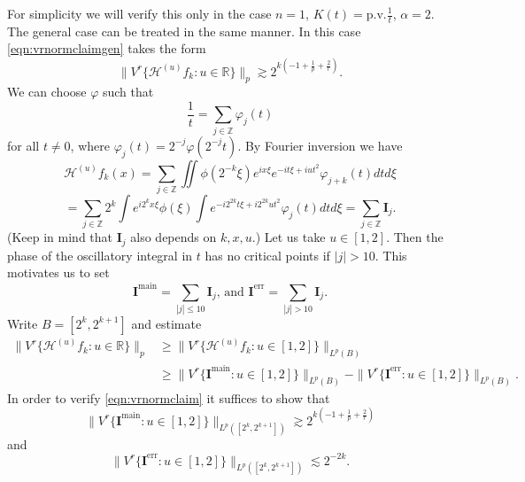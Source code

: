 \documentclass[12pt,leqno]{amsart}
\def\Z{\mathbb{Z}}
\theoremstyle{plain}
\numberwithin{equation}{section}
\begin{document}
For simplicity we will verify this only in the case $n=1$, $K(t)=\textrm{p.v.} \frac{1}{t}$, $\alpha=2$. The general case can be treated in the same manner.
In this case \eqref{eqn:vrnormclaimgen} takes the form
\begin{equation}\label{eqn:vrnormclaim}
\|V^r \{ \mathcal{H}^{(u)} f_k \colon u \in \mathbb{R}\}\|_p \gtrsim 2^{k(-1+\frac1p+\frac2r)}.
\end{equation}
We can choose $\varphi$ such that
\[ \frac1t = \sum_{j\in\Z} \varphi_j(t) \]
for all $t\not=0$, where $\varphi_j(t)=2^{-j} \varphi(2^{-j} t)$.
By Fourier inversion we have
\[ \mathcal{H}^{(u)} f_k (x) = \sum_{j\in\Z} \iint \phi(2^{-k}\xi) e^{ix\xi} e^{-it\xi+iut^2} \varphi_{j+k}(t) dt d\xi \]
\[ = \sum_{j\in\Z} 2^k \int e^{i2^k x\xi} \phi(\xi) \int e^{-i2^{2k}t\xi+i2^{2k} ut^2} \varphi_j(t) dt d\xi = \sum_{j\in\Z} \mathbf{I}_j.\]
(Keep in mind that $\mathbf{I}_j$ also depends on $k,x,u$.)
Let us take $u\in[1,2]$. Then the phase of the oscillatory integral in $t$ has no critical points if $|j|>10$. This motivates us to set
\[ \mathbf{I}^{\textrm{main}} = \sum_{|j|\le 10} \mathbf{I}_j,\,\text{and}\,\,\mathbf{I}^{\textrm{err}} = \sum_{|j|>10} \mathbf{I}_j.\]
Write $B=[2^k,2^{k+1}]$ and estimate
\begin{align*} 
\|V^r \{ \mathcal{H}^{(u)} f_k \colon u \in \mathbb{R}\}\|_p 
&\ge \|V^r \{ \mathcal{H}^{(u)} f_k \colon u \in [1,2]\}\|_{L^p(B)} \\
&\ge \|V^r \{ \mathbf{I}^{\textrm{main}} \colon u \in [1,2]\}\|_{L^p(B)} - \|V^r \{ \mathbf{I}^{\textrm{err}} \colon u \in [1,2]\}\|_{L^p(B)}.
\end{align*}
In order to verify \eqref{eqn:vrnormclaim} it suffices to show that
\begin{equation}\label{eqn:maintermclaim}
\|V^r \{ \mathbf{I}^{\textrm{main}} \colon u \in [1,2]\}\|_{L^p([2^k,2^{k+1}])} \gtrsim 2^{k (-1+\frac1p+\frac2r)}
\end{equation}
and
\begin{equation}\label{eqn:errtermclaim}
\|V^r \{ \mathbf{I}^{\textrm{err}} \colon u \in [1,2]\}\|_{L^p([2^k,2^{k+1}])} \lesssim 2^{-2k}.
\end{equation}
\end{document}
